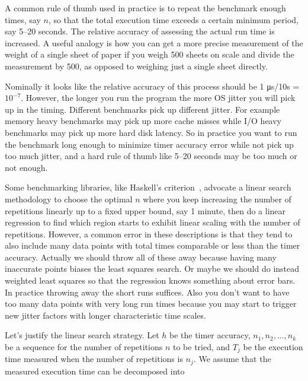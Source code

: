 \documentclass[conference]{IEEEtran}
\begin{document}
A common rule of thumb used in practice is to repeat the benchmark enough times, say $n$, so that the total execution time exceeds a certain minimum period, say 5--20 seconds. The relative accuracy of assessing the actual run time is increased. A useful analogy is how you can get a more precise measurement of the weight of a single sheet of paper if you weigh 500 sheets on scale and divide the measurement by 500, as opposed to weighing just a single sheet directly.

Nominally it looks like the relative accuracy of this process should be 1 μs/10s = $10^{-7}$. However, the longer you run the program the more OS jitter you will pick up in the timing. Different benchmarks pick up different jitter. For example memory heavy benchmarks may pick up more cache misses while I/O heavy benchmarks may pick up more hard disk latency. So in practice you want to run the benchmark long enough to minimize timer accuracy error while not pick up too much jitter, and a hard rule of thumb like 5--20 seconds may be too much or not enough.

Some benchmarking libraries, like Haskell's criterion~\cite{criterion},
advocate a linear search methodology to choose the optimal $n$ where you keep increasing the number of repetitions linearly up to a fixed upper bound, say 1 minute, then do a linear regression to find which region starts to exhibit linear scaling with the number of repetitions. However, a common error in these descriptions is that they tend to also include many data points with total times comparable or less than the timer accuracy. Actually we should throw all of these away because having many inaccurate points biases the least squares search. Or maybe we should do instead weighted least squares so that the regression knows something about error bars. In practice throwing away the short runs suffices. Also you don't want to have too many data points with very long run times because you may start to trigger new jitter factors with longer characteristic time scales.

Let's justify the linear search strategy. Let $h$ be the timer accuracy, $n_1, n_2, ..., n_k$ be a sequence for the number of repetitions $n$ to be tried, and $T_j$ be the execution time measured when the number of repetitions is $n_j$. We assume that the measured execution time can be decomposed into
\end{document}
